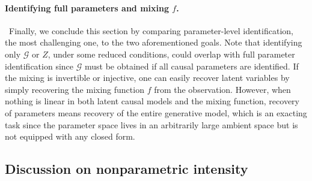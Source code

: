 \documentclass[10pt]{article}
\numberwithin{figure}{section}
\begin{document}
\paragraph{Identifying full parameters and mixing $f$.}~Finally, we conclude this section by comparing parameter-level identification, the most challenging one,  to the two aforementioned goals. Note that identifying only $\mathcal{G}$ or $Z$,  under some reduced conditions, could overlap with full parameter identification since $\mathcal{G}$ must be obtained if all causal parameters are identified. If the mixing is invertible or injective, one can easily recover latent variables by simply recovering the mixing function $f$ from the observation.
However, when nothing is linear in both latent causal models and the mixing function, recovery of parameters means recovery of the entire generative model, which is an exacting task since the parameter space lives in an arbitrarily large ambient space but is not equipped with any closed form. 

\subsection{Discussion on nonparametric intensity}\label{app_npintensity}
\end{document}
